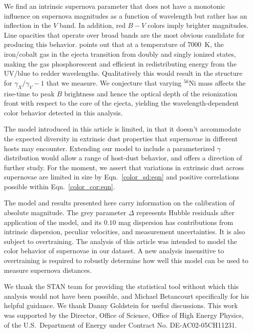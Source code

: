 \documentclass{aastex61}   	%
\begin{document}
We find an intrinsic supernova parameter that does not have a monotonic influence on supernova magnitudes as a function
of wavelength but rather has an inflection in the $V$ band.  In addition, red $B-V$ colors imply brighter magnitudes.  Line opacities
that operate over broad bands are the most obvious candidate for producing this behavior.
\citet{2006ApJ...649..939K} points out that at a temperature of 7000~K, the iron/cobalt gas in the ejecta transition
from doubly and singly ionized states, making the gas phosphorescent and efficient in redistributing energy from the UV/blue to redder
wavelengths.  Qualitatively this would result in the structure for $\gamma_X/\gamma_V-1$ that we measure.
We conjecture that varying $^{56}$Ni mass affects the rise-time to peak $B$ brightness and hence the optical depth
of the reionization front with respect to the core of the ejecta, yielding the wavelength-dependent color behavior
detected in this analysis.

The model introduced in this article is limited, in that it doesn't accommodate the expected diversity
in extrinsic dust properties that supernovae in different hosts may encounter.  Extending our model to 
include  a parameterized  $\gamma$ distribution would allow a range of host-dust behavior, and
offers a direction of further study.
For the moment, we assert that variations in extrinsic dust across supernovae are limited in
size by Eqn.~\ref{color_sd:eqn} and positive correlations possible within Eqn.~\ref{color_cor:eqn}.


The model and results presented here
carry information on the calibration of absolute magnitude.  The grey parameter $\Delta$ represents Hubble residuals after
application of the model, and its  $0.10$ mag dispersion has contributions from intrinsic dispersion, peculiar velocities, and
measurement uncertainties.  It is also subject to overtraining.
The  analysis of this article was intended to model the color behavior of supernovae in our dataset.
\color{red}
A new analysis insensitive to overtraining is required to robustly determine how
well this model can be used to measure supernova distances.
\color{black}

\acknowledgments
We thank the STAN team for providing the statistical tool without which this analysis would not have been possible,
and Michael Betancourt specifically for his helpful guidance.  We thank Danny Goldstein for useful discussions.
This work was supported by the Director, Office of Science, Office of High Energy Physics, 
of the U.S.\ Department of Energy under Contract No. DE-AC02-05CH11231.



\end{document}
